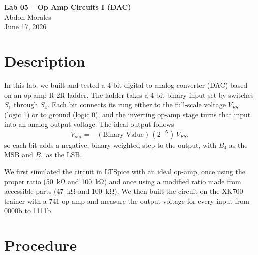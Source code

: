 \documentclass[11pt]{article}
\begin{document}
\begin{center}
    {\LARGE\bfseries Lab 05 -- Op Amp Circuits I (DAC)}\\[0.8em]
    {\large Abdon Morales}\\[0.3em]
    {\large June 17, 2026}
\end{center}
\vspace{1em}

\section*{Description}

In this lab, we built and tested a 4-bit digital-to-analog converter (DAC) based on an op-amp R-2R ladder. The ladder takes a 4-bit binary input set by switches $S_1$ through $S_4$. Each bit connects its rung either to the full-scale voltage $V_{FS}$ (logic 1) or to ground (logic 0), and the inverting op-amp stage turns that input into an analog output voltage. The ideal output follows
\[
    V_{out} = -(\text{Binary Value})\,(2^{-N})\,V_{FS},
\]
so each bit adds a negative, binary-weighted step to the output, with $B_4$ as the MSB and $B_1$ as the LSB.

We first simulated the circuit in LTSpice with an ideal op-amp, once using the proper ratio (\SI{50}{\kilo\ohm} and \SI{100}{\kilo\ohm}) and once using a modified ratio made from accessible parts (\SI{47}{\kilo\ohm} and \SI{100}{\kilo\ohm}). We then built the circuit on the XK700 trainer with a 741 op-amp and measure the output voltage for every input from 0000b to 1111b.

\section*{Procedure}
\end{document}
